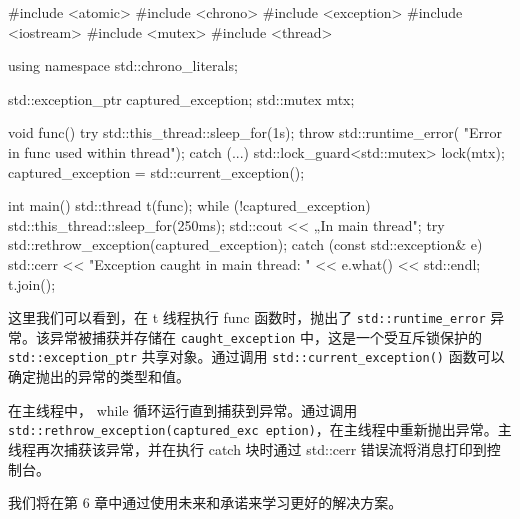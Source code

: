 \begin{cpp}
#include <atomic>
#include <chrono>
#include <exception>
#include <iostream>
#include <mutex>
#include <thread>

using namespace std::chrono_literals;

std::exception_ptr captured_exception;
std::mutex mtx;

void func() {
    try {
        std::this_thread::sleep_for(1s);
        throw std::runtime_error(
        "Error in func used within thread");
    } catch (...) {
        std::lock_guard<std::mutex> lock(mtx);
        captured_exception = std::current_exception();
    }
}

int main() {
    std::thread t(func);
    while (!captured_exception) {
        std::this_thread::sleep_for(250ms);
        std::cout << „In main thread\n";
    }
    try {
        std::rethrow_exception(captured_exception);
    } catch (const std::exception& e) {
        std::cerr << "Exception caught in main thread: "
        << e.what() << std::endl;
    }
    t.join();
}
\end{cpp}

这里我们可以看到，在 t 线程执行 func 函数时，抛出了 \verb|std::runtime_error| 异常。该异常被捕获并存储在 \verb|caught_exception| 中，这是一个受互斥锁保护的 \verb|std::exception_ptr| 共享对象。通过调用 \verb|std::current_exception()| 函数可以确定抛出的异常的类型和值。

在主线程中， while 循环运行直到捕获到异常。通过调用 \verb|std::rethrow_exception(captured_exc eption)|，在主线程中重新抛出异常。主线程再次捕获该异常，并在执行 catch 块时通过 std::cerr 错误流将消息打印到控制台。

我们将在第 6 章中通过使用未来和承诺来学习更好的解决方案。









